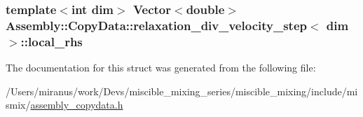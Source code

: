 \subsubsection[{local\+\_\+rhs}]{\setlength{\rightskip}{0pt plus 5cm}template$<$int dim$>$ Vector$<$double$>$ {\bf Assembly\+::\+Copy\+Data\+::relaxation\+\_\+div\+\_\+velocity\+\_\+step}$<$ dim $>$\+::local\+\_\+rhs}\label{struct_assembly_1_1_copy_data_1_1relaxation__div__velocity__step_ae75901aacdb5388ace8358c26786fe9c}


The documentation for this struct was generated from the following file\+:\begin{DoxyCompactItemize}
\item 
/\+Users/miranus/work/\+Devs/miscible\+\_\+mixing\+\_\+series/miscible\+\_\+mixing/include/mismix/\hyperlink{assembly__copydata_8h}{assembly\+\_\+copydata.\+h}\end{DoxyCompactItemize}
